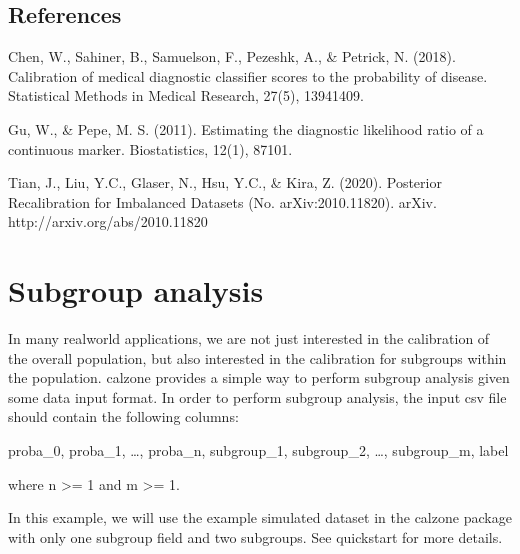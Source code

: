 \documentclass[letterpaper,10pt,english]{sphinxmanual}
\begin{document}
\section{References}
\label{\detokenize{notebooks/prevalence_adjustment:References}}
\sphinxAtStartPar
Chen, W., Sahiner, B., Samuelson, F., Pezeshk, A., \& Petrick, N. (2018). Calibration of medical diagnostic classifier scores to the probability of disease. Statistical Methods in Medical Research, 27(5), 1394\textendash{}1409. 

\sphinxAtStartPar
Gu, W., \& Pepe, M. S. (2011). Estimating the diagnostic likelihood ratio of a continuous marker. Biostatistics, 12(1), 87\textendash{}101. 

\sphinxAtStartPar
Tian, J., Liu, Y.\sphinxhyphen{}C., Glaser, N., Hsu, Y.\sphinxhyphen{}C., \& Kira, Z. (2020). Posterior Re\sphinxhyphen{}calibration for Imbalanced Datasets (No. arXiv:2010.11820). arXiv. http://arxiv.org/abs/2010.11820

\sphinxstepscope


\chapter{Subgroup analysis}
\label{\detokenize{notebooks/subgroup:Subgroup-analysis}}\label{\detokenize{notebooks/subgroup::doc}}
\sphinxAtStartPar
In many real\sphinxhyphen{}world applications, we are not just interested in the calibration of the overall population, but also interested in the calibration for subgroups within the population. calzone provides a simple way to perform subgroup analysis given some data input format. In order to perform subgroup analysis, the input csv file should contain the following columns:

\sphinxAtStartPar
proba\_0, proba\_1, …, proba\_n, subgroup\_1, subgroup\_2, …, subgroup\_m, label

\sphinxAtStartPar
where n \textgreater{}= 1 and m \textgreater{}= 1.

\sphinxAtStartPar
In this example, we will use the example simulated dataset in the calzone package with only one subgroup field and two subgroups. See quickstart for more details.
\end{document}

